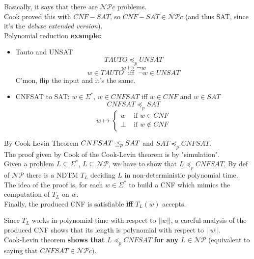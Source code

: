 	Basically, it says that there are $\mathcal{NP}c$ problems.\\

	Cook proved this with $CNF-SAT$, so $CNF-SAT \in \mathcal{NP}c$ (and thus SAT, since it's the \textit{deluxe extended version}).\\

	Polynomial reduction \textbf{example:}
	\begin{itemize}
		\item Tauto and UNSAT
		$$ TAUTO \preceq_p UNSAT $$
		$$ w \mapsto \neg w $$
		$$ w \in TAUTO \; \text{ iff } \; \neg w \in UNSAT $$
		C'mon, flip the input and it's the same.\\

		\item CNFSAT to SAT: $w \in \Sigma^\ast$, $w \in CNFSAT$ iff $w \in CNF$ and $w \in SAT$
		$$ CNFSAT \preceq_p SAT $$
		$$ w \mapsto \begin{cases}
			w & \text{ if } w \in CNF \\
			\bot & \text{ if } w \notin CNF
		\end{cases}$$
		\nn
	\end{itemize}


	By Cook-Levin Theorem $CNFSAT \preceq_p SAT$ and $SAT \preceq_p CNFSAT$.\\

	The proof given by Cook of the Cook-Levin theorem is by "simulation".\\

	Given a problem $L \subseteq \Sigma^\ast$, $L \subseteq \mathcal{NP}$, we have to show that $L \preceq_p CNFSAT$. By def of $\mathcal{NP}$ there is a NDTM $T_L$ deciding $L$ in non-deterministic polynomial time.\\

	The idea of the proof is, for each $w \in \Sigma^\ast$ to build a CNF which mimics the computation of $T_L$ on $w$.\\
	Finally, the produced CNF is satisfiable \textbf{iff} $T_L (w)$ accepts.\\

	\newpage

	Since $T_L$ works in polynomial time with respect to $||w||$, a careful analysis of the produced CNF shows that its length is polynomial with respect to $||w||$.\\

	Cook-Levin theorem \textbf{shows that} $L \preceq_p CNFSAT$ \textbf{for any} $L \in \mathcal{NP}$ (equivalent to saying that $CNFSAT \in \mathcal{NP}c$).\\

